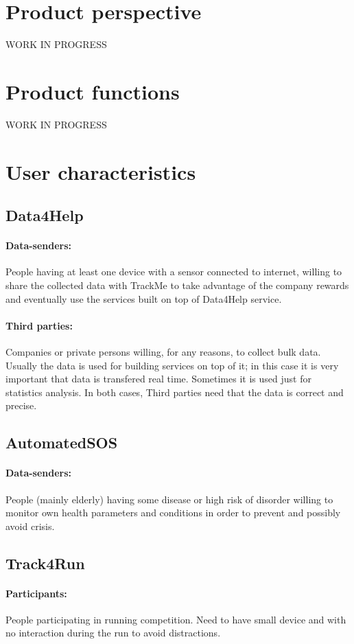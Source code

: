 \documentclass{report}
\begin{document}
		\section{Product perspective}
		WORK IN PROGRESS
		\section{Product functions}
		WORK IN PROGRESS
		\section{User characteristics}
			\subsection{Data4Help}
			\paragraph{Data-senders:}
			People having at least one device with a sensor connected to internet, willing to share the collected data with TrackMe to take advantage of the company rewards and eventually use the services built on top of Data4Help service.
			\paragraph{Third parties:}
			Companies or private persons willing, for any reasons, to collect bulk data. Usually the data is used for building services on top of it; in this case it is very important that data is transfered real time. Sometimes it is used just for statistics analysis. In both cases, Third parties need that the data is correct and precise. 
			\subsection{AutomatedSOS}
			\paragraph{Data-senders:}
			People (mainly elderly) having some disease or high risk of disorder willing to monitor own health parameters and conditions in order to prevent and possibly avoid crisis.
			\subsection{Track4Run}
			\paragraph{Participants:}
			People participating in running competition. Need to have small device and with no interaction during the run to avoid distractions.
\end{document}
